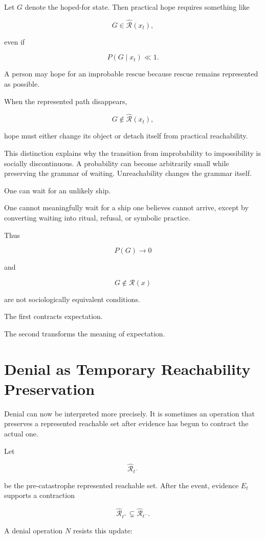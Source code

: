 \documentclass[11pt,oneside]{book}
\theoremstyle{definition}
\theoremstyle{remark}
\newcommand{\R}{\mathcal{R}}
\begin{document}
Let \(G\) denote the hoped-for state. Then practical hope requires something like

\[
G\in\widehat{\R}(x_t),
\]

even if

\[
P(G\mid x_t)\ll1.
\]

A person may hope for an improbable rescue because rescue remains represented as possible.

When the represented path disappears,

\[
G\notin\widehat{\R}(x_t),
\]

hope must either change its object or detach itself from practical reachability.

This distinction explains why the transition from improbability to impossibility is socially discontinuous. A probability can become arbitrarily small while preserving the grammar of waiting. Unreachability changes the grammar itself.

One can wait for an unlikely ship.

One cannot meaningfully wait for a ship one believes cannot arrive, except by converting waiting into ritual, refusal, or symbolic practice.

Thus

\[
P(G)\rightarrow0
\]

and

\[
G\notin\R(x)
\]

are not sociologically equivalent conditions.

The first contracts expectation.

The second transforms the meaning of expectation.

\section{Denial as Temporary Reachability Preservation}

Denial can now be interpreted more precisely. It is sometimes an operation that preserves a represented reachable set after evidence has begun to contract the actual one.

Let

\[
\widehat{\R}_{t^-}
\]

be the pre-catastrophe represented reachable set. After the event, evidence \(E_t\) supports a contraction

\[
\widehat{\R}_{t^+}
\subsetneq
\widehat{\R}_{t^-}.
\]

A denial operation \(N\) resists this update:
\end{document}
